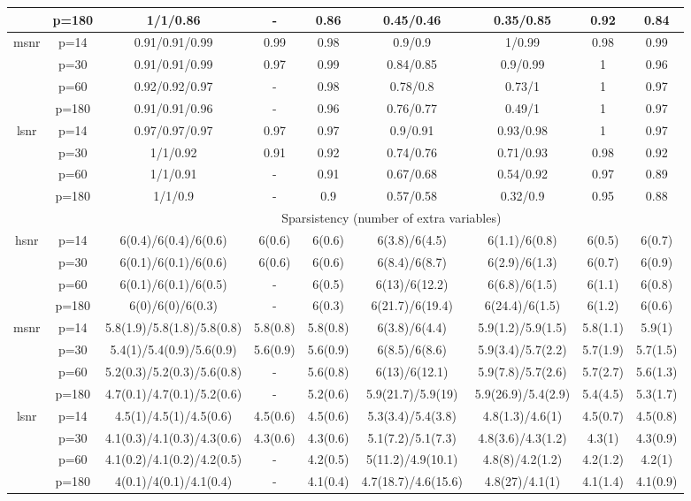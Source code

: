 \begin{table}[ht]
{\begin{tabular}{|c|c|ccccccc|}
   & p=180 & 1/1/0.86 & - & 0.86 & 0.45/0.46 & 0.35/0.85 & 0.92 & 0.84 \\ 
  \midrule\multirow{4}[2]{*}{msnr} & p=14 & 0.91/0.91/0.99 & 0.99 & 0.98 & 0.9/0.9 & 1/0.99 & 0.98 & 0.99 \\ 
   & p=30 & 0.91/0.91/0.99 & 0.97 & 0.99 & 0.84/0.85 & 0.9/0.99 & 1 & 0.96 \\ 
   & p=60 & 0.92/0.92/0.97 & - & 0.98 & 0.78/0.8 & 0.73/1 & 1 & 0.97 \\ 
   & p=180 & 0.91/0.91/0.96 & - & 0.96 & 0.76/0.77 & 0.49/1 & 1 & 0.97 \\ 
  \midrule\multirow{4}[2]{*}{lsnr} & p=14 & 0.97/0.97/0.97 & 0.97 & 0.97 & 0.9/0.91 & 0.93/0.98 & 1 & 0.97 \\ 
   & p=30 & 1/1/0.92 & 0.91 & 0.92 & 0.74/0.76 & 0.71/0.93 & 0.98 & 0.92 \\ 
   & p=60 & 1/1/0.91 & - & 0.91 & 0.67/0.68 & 0.54/0.92 & 0.97 & 0.89 \\ 
   & p=180 & 1/1/0.9 & - & 0.9 & 0.57/0.58 & 0.32/0.9 & 0.95 & 0.88 \\ 
   \midrule 
 \multicolumn{1}{|c}{} &       & \multicolumn{7}{c|}{Sparsistency (number of extra variables)} \\
\midrule\multirow{4}[2]{*}{hsnr} & p=14 & 6(0.4)/6(0.4)/6(0.6) & 6(0.6) & 6(0.6) & 6(3.8)/6(4.5) & 6(1.1)/6(0.8) & 6(0.5) & 6(0.7) \\ 
   & p=30 & 6(0.1)/6(0.1)/6(0.6) & 6(0.6) & 6(0.6) & 6(8.4)/6(8.7) & 6(2.9)/6(1.3) & 6(0.7) & 6(0.9) \\ 
   & p=60 & 6(0.1)/6(0.1)/6(0.5) & - & 6(0.5) & 6(13)/6(12.2) & 6(6.8)/6(1.5) & 6(1.1) & 6(0.8) \\ 
   & p=180 & 6(0)/6(0)/6(0.3) & - & 6(0.3) & 6(21.7)/6(19.4) & 6(24.4)/6(1.5) & 6(1.2) & 6(0.6) \\ 
  \midrule\multirow{4}[2]{*}{msnr} & p=14 & 5.8(1.9)/5.8(1.8)/5.8(0.8) & 5.8(0.8) & 5.8(0.8) & 6(3.8)/6(4.4) & 5.9(1.2)/5.9(1.5) & 5.8(1.1) & 5.9(1) \\ 
   & p=30 & 5.4(1)/5.4(0.9)/5.6(0.9) & 5.6(0.9) & 5.6(0.9) & 6(8.5)/6(8.6) & 5.9(3.4)/5.7(2.2) & 5.7(1.9) & 5.7(1.5) \\ 
   & p=60 & 5.2(0.3)/5.2(0.3)/5.6(0.8) & - & 5.6(0.8) & 6(13)/6(12.1) & 5.9(7.8)/5.7(2.6) & 5.7(2.7) & 5.6(1.3) \\ 
   & p=180 & 4.7(0.1)/4.7(0.1)/5.2(0.6) & - & 5.2(0.6) & 5.9(21.7)/5.9(19) & 5.9(26.9)/5.4(2.9) & 5.4(4.5) & 5.3(1.7) \\ 
  \midrule\multirow{4}[2]{*}{lsnr} & p=14 & 4.5(1)/4.5(1)/4.5(0.6) & 4.5(0.6) & 4.5(0.6) & 5.3(3.4)/5.4(3.8) & 4.8(1.3)/4.6(1) & 4.5(0.7) & 4.5(0.8) \\ 
   & p=30 & 4.1(0.3)/4.1(0.3)/4.3(0.6) & 4.3(0.6) & 4.3(0.6) & 5.1(7.2)/5.1(7.3) & 4.8(3.6)/4.3(1.2) & 4.3(1) & 4.3(0.9) \\ 
   & p=60 & 4.1(0.2)/4.1(0.2)/4.2(0.5) & - & 4.2(0.5) & 5(11.2)/4.9(10.1) & 4.8(8)/4.2(1.2) & 4.2(1.2) & 4.2(1) \\ 
   & p=180 & 4(0.1)/4(0.1)/4.1(0.4) & - & 4.1(0.4) & 4.7(18.7)/4.6(15.6) & 4.8(27)/4.1(1) & 4.1(1.4) & 4.1(0.9) \\ 
   \bottomrule 
\end{tabular}
}
\end{table}

